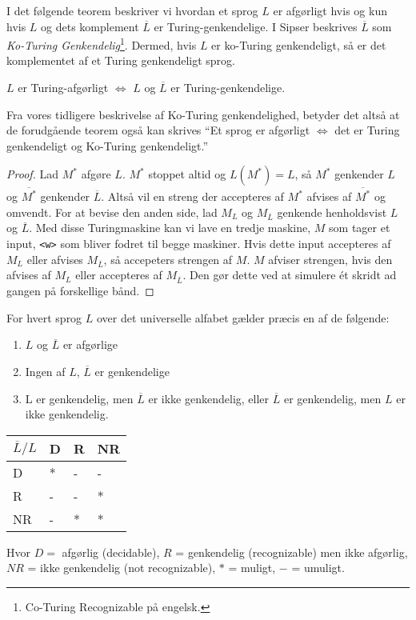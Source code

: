 I det følgende teorem beskriver vi hvordan et sprog $L$ er afgørligt hvis og kun hvis $L$ og dets komplement $\overline{L}$ er Turing-genkendelige. I Sipser beskrives $\overline{L}$ som \textit{Ko-Turing Genkendelig}\footnote{Co-Turing Recognizable på engelsk.}. Dermed, hvis $L$ er ko-Turing genkendeligt, så er det komplementet af et Turing genkendeligt sprog.

\begin{theorem}
  \label{teo:decideablecoturing}
	$L$ er Turing-afgørligt $\iff$ $L$ og $\overline{L}$ er Turing-genkendelige.
\end{theorem}

Fra vores tidligere beskrivelse af Ko-Turing genkendelighed, betyder det altså at de forudgående teorem også kan skrives ``Et sprog er afgørligt $\iff$ det er Turing genkendeligt og Ko-Turing  genkendeligt.''

\begin{proof}
	Lad $M^{*}$ afgøre $L$. $M^{*}$ stoppet altid og $L(M^{*}) = L$, så $M^{*}$ genkender $L$ og $\overline{M^{*}}$ genkender $\overline{L}$. Altså vil en streng der accepteres af $M^{*}$ afvises af $\overline{M^{*}}$ og omvendt. For at bevise den anden side, lad $M_{L}$ og $M_{\overline{L}}$ genkende henholdsvist $L$ og $\overline{L}$. Med disse Turingmaskine kan vi lave en tredje maskine, $M$ som tager et input, \texttt{<w>} som bliver fodret til begge maskiner. Hvis dette input accepteres af $M_{L}$ eller afvises $M_{\overline{L}}$, så accepeters strengen af $M$. $M$ afviser strengen, hvis den afvises af $M_{L}$ eller accepteres af $M_{\overline{L}}$. Den gør dette ved at simulere ét skridt ad gangen på forskellige bånd.
\end{proof}

\begin{theorem}
	For hvert sprog $L$ over det universelle alfabet gælder præcis en af de følgende:
	\begin{enumerate}
		\item $L$ og $\overline{L}$ er afgørlige
		\item Ingen af $L$, $\overline{L}$ er genkendelige
		\item L er genkendelig, men $\overline{L}$ er ikke genkendelig, eller $\overline{L}$ er genkendelig, men $L$ er ikke genkendelig.
	\end{enumerate}
	\begin{table}[ht]
		\centering
		\begin{tabular}{|l|l|l|l|}
			\hline
			$\overline{L} / L$ & D & R & NR \\ \hline
			D                  & * & - & -  \\ \hline
			R                  & - & - & *  \\ \hline
			NR                 & - & * & *  \\ \hline
		\end{tabular}
	\end{table}
	Hvor $D = $ afgørlig (decidable), $R$ = genkendelig (recognizable) men ikke afgørlig, $NR$ = ikke genkendelig (not recognizable), $*$ = muligt, $-$ = umuligt.
\end{theorem}

